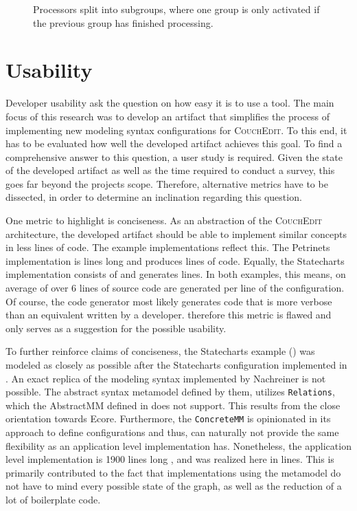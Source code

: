 \begin{figure}
  \centering
  
  \caption{Processors split into subgroups, where one group is only activated if the previous group has finished processing.}
  \label{fig:sub-groups}
\end{figure}

\section{Usability}
Developer usability ask the question on how easy it is to use a tool. The main focus of this research was to develop an artifact that simplifies the process of implementing new modeling syntax configurations for \textsc{CouchEdit}. To this end, it has to be evaluated how well the developed artifact achieves this goal. To find a comprehensive answer to this question, a user study is required. Given the state of the developed artifact as well as the time required to conduct a survey, this goes far beyond the projects scope. Therefore, alternative metrics have to be dissected, in order to determine an inclination regarding this question.

One metric to highlight is conciseness. As an abstraction of the \textsc{CouchEdit} architecture, the developed artifact should be able to implement similar concepts in less lines of code. The example implementations reflect this. The Petrinets implementation is \petriConfigLoC lines long and produces \petriGeneratedLoC lines of code. Equally, the Statecharts implementation consists of \stateConfigLoC and generates \stateGeneratedLoC lines. In both examples, this means, on average of over 6 lines of source code are generated per line of the configuration. Of course, the code generator most likely generates code that is more verbose than an equivalent written by a developer. therefore this metric is flawed and only serves as a suggestion for the possible usability.

To further reinforce claims of conciseness, the Statecharts example () was modeled as closely as possible after the Statecharts configuration implemented in \cite{nachreiner_couchedit_2020}. An exact replica of the modeling syntax implemented by Nachreiner is not possible. The abstract syntax metamodel defined by them, utilizes \texttt{Relations}, which the AbstractMM defined in  does not support. This results from the close orientation towards Ecore. Furthermore, the \texttt{ConcreteMM} is opinionated in its approach to define configurations and thus, can naturally not provide the same flexibility as an application level implementation has. Nonetheless, the application level implementation is 1900 lines long \cite{nachreiner_couchedit_2020}, and was realized here in \stateConfigLoC lines. This is primarily contributed to the fact that implementations using the metamodel do not have to mind every possible state of the graph, as well as the reduction of a lot of boilerplate code.

